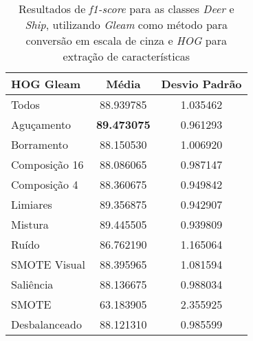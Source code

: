 %
\begin{table}[H]
\begin{center}
\caption{Resultados de \textit{f1-score} para as classes \textit{Deer} e \textit{Ship}, utilizando \emph{Gleam} como método para conversão em escala de cinza e \emph{HOG} para extração de características}
\label{tab:resultados:5:melhor}
\begin{tabular}{|l|c|c|}
\hline
\textbf{HOG Gleam} & \textbf{Média}     & \textbf{Desvio Padrão} \\ \hline
   Todos        &  88.939785 &  1.035462  \\ \hline
  Aguçamento    &  \textbf{89.473075} &  0.961293  \\ \hline
  Borramento    &  88.150530 &  1.006920  \\ \hline
  Composição 16 &  88.086065 &  0.987147  \\ \hline
  Composição 4  &  88.360675 &  0.949842  \\ \hline
  Limiares      &  89.356875 &  0.942907  \\ \hline
  Mistura       &  89.445505 &  0.939809  \\ \hline
  Ruído         &  86.762190 &  1.165064  \\ \hline
  SMOTE Visual  &  88.395965 &  1.081594  \\ \hline
  Saliência     &  88.136675 &  0.988034  \\ \hline
 SMOTE          &  63.183905 &  2.355925  \\ \hline
Desbalanceado   &  88.121310 &  0.985599  \\ \hline
\end{tabular}
\end{center}
\end{table}



